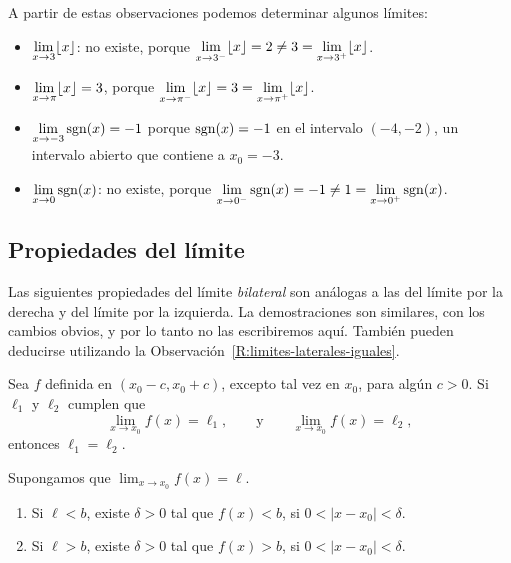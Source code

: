 \begin{example}
    A partir de estas observaciones podemos determinar algunos límites:
    \begin{itemize}
        \item $\displaystyle\lim_{x\to 3} \lfloor x \rfloor $: 
        no existe, porque $\displaystyle\lim_{x\to 3^-} \lfloor x \rfloor = 2\neq 3 = \displaystyle\lim_{x\to 3^+} \lfloor x \rfloor $.
        \item $\displaystyle\lim_{x\to \pi} \lfloor x \rfloor=3 $, 
        porque $\displaystyle\lim_{x\to \pi^-} \lfloor x \rfloor = 3 = \displaystyle\lim_{x\to \pi^+} \lfloor x \rfloor $.
        \item $\displaystyle\lim_{x\to -3} \operatorname{sgn}(x) = -1$ porque $\operatorname{sgn}(x)=-1$ en el intervalo $(-4,-2)$, un intervalo abierto que contiene a $x_0=-3$.
        \item $\displaystyle\lim_{x\to 0} \operatorname{sgn}(x)$: 
        no existe, porque $\displaystyle\lim_{x\to 0^-} \operatorname{sgn}(x) = -1 \neq 1 = \lim_{x\to 0^+} \operatorname{sgn}(x) $.
    \end{itemize}
\end{example}

\subsection{Propiedades del límite}


Las siguientes propiedades del límite \emph{bilateral} son análogas a las del límite por la derecha y del límite por la izquierda.
La demostraciones son similares, con los cambios obvios, y por lo tanto no las escribiremos aquí. También pueden deducirse utilizando la Observación~\ref{R:limites-laterales-iguales}.

\begin{proposition}
    Sea $f$ definida en $(x_0-c,x_0+c)$, excepto tal vez en $x_0$, para algún $c>0$. Si $\ell_1$ y $\ell_2$ cumplen que
    \[
    \lim_{x\to x_0} f(x)=\ell_1, 
    \qquad \text{y}\qquad 
    \lim_{x\to x_0} f(x)=\ell_2,
    \]
    entonces $\ell_1=\ell_2$.
\end{proposition}

\begin{proposition}
    Supongamos que $\lim_{x\to x_0} f(x)=\ell$.
    \begin{enumerate}
        \item Si $\ell<b$, existe $\delta>0$ tal que $f(x)<b$, si $0<|x-x_0|<\delta$.
        \item Si $\ell>b$, existe $\delta>0$ tal que $f(x)>b$, si $0<|x-x_0|<\delta$.
    \end{enumerate}
\end{proposition}

